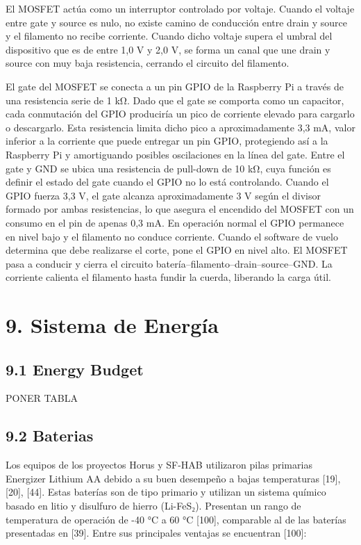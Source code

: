 \documentclass[12pt,a4paper]{article}
\begin{document}
El MOSFET actúa como un interruptor controlado por voltaje. Cuando el voltaje entre gate y source es nulo, no existe camino de conducción entre drain y source y el filamento no recibe corriente. Cuando dicho voltaje supera el umbral del dispositivo que es de entre 1,0 V y 2,0 V, se forma un canal que une drain y source con muy baja resistencia, cerrando el circuito del filamento.

El gate del MOSFET se conecta a un pin GPIO de la Raspberry Pi a través de una resistencia serie de 1 kΩ. Dado que el gate se comporta como un capacitor, cada conmutación del GPIO produciría un pico de corriente elevado para cargarlo o descargarlo. Esta resistencia limita dicho pico a aproximadamente 3,3 mA, valor inferior a la corriente que puede entregar un pin GPIO, protegiendo así a la Raspberry Pi y amortiguando posibles oscilaciones en la línea del gate. Entre el gate y GND se ubica una resistencia de pull-down de 10 kΩ, cuya función es definir el estado del gate cuando el GPIO no lo está controlando. Cuando el GPIO fuerza 3,3 V, el gate alcanza aproximadamente 3 V según el divisor formado por ambas resistencias, lo que asegura el encendido del MOSFET con un consumo en el pin de apenas 0,3 mA. En operación normal el GPIO permanece en nivel bajo y el filamento no conduce corriente. Cuando el software de vuelo determina que debe realizarse el corte, pone el GPIO en nivel alto. El MOSFET pasa a conducir y cierra el circuito batería--filamento--drain--source--GND. La corriente calienta el filamento hasta fundir la cuerda, liberando la carga útil.

\section{\texorpdfstring{\textbf{9. Sistema de Energía}}{9. Sistema de Energía}}\label{sistema-de-energuxeda}

\subsection{9.1 Energy Budget}\label{energy-budget}

PONER TABLA

\subsection{9.2 Baterias}\label{baterias-1}

Los equipos de los proyectos Horus y SF-HAB utilizaron pilas primarias Energizer Lithium AA debido a su buen desempeño a bajas temperaturas {[}19{]}, {[}20{]}, {[}44{]}. Estas baterías son de tipo primario y utilizan un sistema químico basado en litio y disulfuro de hierro (Li-FeS₂). Presentan un rango de temperatura de operación de -40 °C a 60 °C {[}100{]}, comparable al de las baterías presentadas en {[}39{]}. Entre sus principales ventajas se encuentran {[}100{]}:
\end{document}
